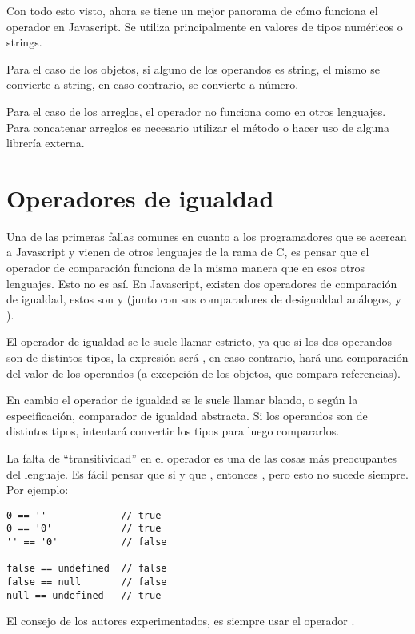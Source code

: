 Con todo esto visto, ahora se tiene un mejor panorama de cómo funciona el operador \code{+} en Javascript. Se utiliza principalmente en valores de tipos numéricos o strings. 

Para el caso de los objetos, si alguno de los operandos es string, el mismo se convierte a string, en caso contrario, se convierte a número. 

Para el caso de los arreglos, el operador \code{+} no funciona como en otros lenguajes. Para concatenar arreglos es necesario utilizar el método  o hacer uso de alguna librería externa.

\section{Operadores de igualdad}
\label{sec:eqeqeq}

Una de las primeras fallas comunes en cuanto a los programadores que se acercan a Javascript y vienen de otros lenguajes de la rama de C, es pensar que el operador de comparación \code{==} funciona de la misma manera que en esos otros lenguajes. Esto no es así. En Javascript, existen dos operadores de comparación de igualdad, estos son \code{==} y \code{===} (junto con sus comparadores de desigualdad análogos, \code{!=} y \code{!==}).

El operador de igualdad \code{===} se le suele llamar estricto, ya que si los dos operandos son de distintos tipos, la expresión será , en caso contrario, hará una comparación del valor de los operandos (a excepción de los objetos, que compara referencias).

En cambio el operador de igualdad \code{==} se le suele llamar blando, o según la especificación, comparador de igualdad abstracta. Si los operandos son de distintos tipos, intentará convertir los tipos para luego compararlos.



La falta de "`transitividad"' en el operador \code{==} es una de las cosas más preocupantes del lenguaje. Es fácil pensar que si  y que , entonces , pero esto no sucede siempre.  Por ejemplo:

\begin{lstlisting}[title={Falta de transitividad en \code{==}}]
0 == ''             // true
0 == '0'            // true
'' == '0'           // false

false == undefined  // false
false == null       // false
null == undefined   // true
\end{lstlisting}

El consejo de los autores experimentados, es siempre usar el operador \code{===}.

